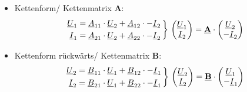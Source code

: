 \begin{itemize}
            \item{Kettenform/ Kettenmatrix \textbf{A}:}
                \begin{align*}
                    \begin{split}
                        \underline{U}_1 &= \underline{A}_{11}\cdot\underline{U}_2 + \underline{A}_{12}\cdot-\underline{I}_2 \\
                        \underline{I}_1 &= \underline{A}_{21}\cdot\underline{U}_2 + \underline{A}_{22}\cdot-\underline{I}_2
                    \end{split}
                \left\} \
                    \begin{pmatrix}
                        \underline{U}_1 \\
                        \underline{I}_2
                    \end{pmatrix} = \textbf{\underline{A}}\cdot
                    \begin{pmatrix}
                        \underline{U}_2 \\
                        -\underline{I}_2
                    \end{pmatrix}
                \right.
                \end{align*}
                \item{Kettenform rückwärts/ Kettenmatrix \textbf{B}:}
                    \begin{align*}
                        \begin{split}
                            \underline{U}_2 &= \underline{B}_{11}\cdot\underline{U}_1 + \underline{B}_{12}\cdot-\underline{I}_1\\
                            \underline{I}_2 &= \underline{B}_{21}\cdot\underline{U}_1 + \underline{B}_{22}\cdot-\underline{I}_1
                        \end{split}
                    \left\} \
                    \begin{pmatrix}
                        \underline{U}_2\\
                        \underline{I}_2
                    \end{pmatrix} = \textbf{\underline{B}}\cdot
                    \begin{pmatrix}
                        \underline{U}_1 \\
                        -\underline{I}_1
                    \end{pmatrix}
                \right.
                    \end{align*}
    \end{itemize}
    
